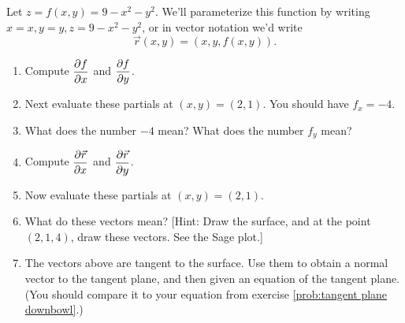 \begin{problem}
Let $z=f(x,y)=9-x^2-y^2$. We'll parameterize this function by writing $x=x, y=y, z=9-x^2-y^2$, or in vector notation we'd write $$\vec r(x,y) = (x,y,f(x,y)).$$ 
\begin{enumerate}
	\item Compute $\displaystyle \frac{\partial f}{\partial x}$ and $\displaystyle \frac{\partial f}{\partial y}$. 
	\item Next evaluate these partials at $(x,y)=(2,1)$. You should have $f_x=-4$. 
	\item What does the number $-4$ mean? What does the number $f_y$ mean? 
	\item Compute $\displaystyle \frac{\partial \vec r}{\partial x}$ and $\displaystyle \frac{\partial \vec r}{\partial y}$. 
	\item Now evaluate these partials at $(x,y)=(2,1)$.  
	\item What do these vectors mean? [Hint: Draw the surface, and at the point $(2,1,4)$, draw these vectors. See the Sage plot.]
	\item The vectors above are tangent to the surface. Use them to obtain a normal vector to the tangent plane, and then given an equation of the tangent plane. (You should compare it to your equation from exercise \ref{prob:tangent plane downbowl}.)
\end{enumerate}
\end{problem}


